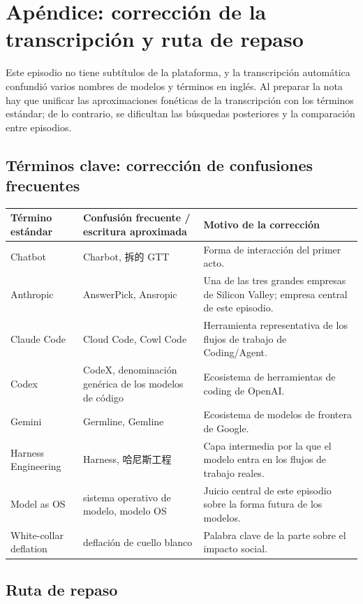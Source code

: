 \section{Apéndice: corrección de la transcripción y ruta de repaso}

Este episodio no tiene subtítulos de la plataforma, y la transcripción automática confundió varios nombres de modelos y términos en inglés. Al preparar la nota hay que unificar las aproximaciones fonéticas de la transcripción con los términos estándar; de lo contrario, se dificultan las búsquedas posteriores y la comparación entre episodios.

\subsection{Términos clave: corrección de confusiones frecuentes}

\noindent\begin{longtable}{p{}p{}p{}}
\toprule
Término estándar & Confusión frecuente / escritura aproximada & Motivo de la corrección \\
\midrule
Chatbot & Charbot, 拆的 GTT & Forma de interacción del primer acto. \\
Anthropic & AnswerPick, Ansropic & Una de las tres grandes empresas de Silicon Valley; empresa central de este episodio. \\
Claude Code & Cloud Code, Cowl Code & Herramienta representativa de los flujos de trabajo de Coding/Agent. \\
Codex & CodeX, denominación genérica de los modelos de código & Ecosistema de herramientas de coding de OpenAI. \\
Gemini & Germline, Gemline & Ecosistema de modelos de frontera de Google. \\
Harness Engineering & Harness, 哈尼斯工程 & Capa intermedia por la que el modelo entra en los flujos de trabajo reales. \\
Model as OS & sistema operativo de modelo, modelo OS & Juicio central de este episodio sobre la forma futura de los modelos. \\
White-collar deflation & deflación de cuello blanco & Palabra clave de la parte sobre el impacto social. \\
\bottomrule
\end{longtable}

\subsection{Ruta de repaso}

